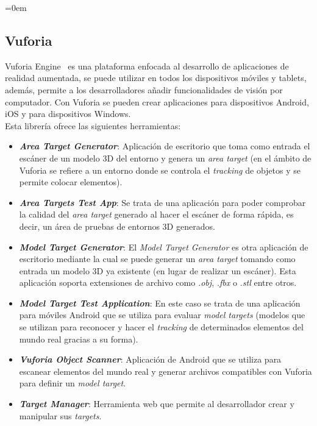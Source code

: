 \parindent=0em
\subsection{Vuforia}
\noindent

Vuforia Engine~\cite{vuforiaMain} es una plataforma enfocada al desarrollo de aplicaciones de realidad aumentada, se puede utilizar en todos los dispositivos móviles y tablets, además, permite a los desarrolladores añadir funcionalidades de visión por computador. Con Vuforia se pueden crear aplicaciones para dispositivos Android, iOS y para dispositivos Windows. \\

Esta librería ofrece las siguientes herramientas: 

\begin{itemize}
    \item \textit{\textbf{Area Target Generator}}: Aplicación de escritorio que toma como entrada el escáner de un modelo 3D del entorno y genera un \textit{area target} (en el ámbito de Vuforia se refiere a un entorno donde se controla el \textit{tracking} de objetos y se permite colocar elementos).
    
    \item \textit{\textbf{Area Targets Test App}}: Se trata de una aplicación para poder comprobar la calidad del \textit{area target} generado al hacer el escáner de forma rápida, es decir, un área de pruebas de entornos 3D generados.
    
    \item \textit{\textbf{Model Target Generator}}: El \textit{Model Target Generator} es otra aplicación de escritorio mediante la cual se puede generar un \textit{area target} tomando como entrada un modelo 3D ya existente (en lugar de realizar un escáner). Esta aplicación soporta extensiones de archivo como \textit{.obj}, \textit{.fbx} o \textit{.stl} entre otros.
    
    \item \textit{\textbf{Model Target Test Application}}: En este caso se trata de una aplicación para móviles Android que se utiliza para evaluar \textit{model targets} (modelos que se utilizan para reconocer y hacer el \textit{tracking} de determinados elementos del mundo real gracias a su forma).
    
    \item \textit{\textbf{Vuforia Object Scanner}}: Aplicación de Android que se utiliza para escanear elementos del mundo real y generar archivos compatibles con Vuforia para definir un \textit{model target}.
    
    \item \textit{\textbf{Target Manager}}: Herramienta web que permite al desarrollador crear y manipular sus \textit{targets}.
\end{itemize}

